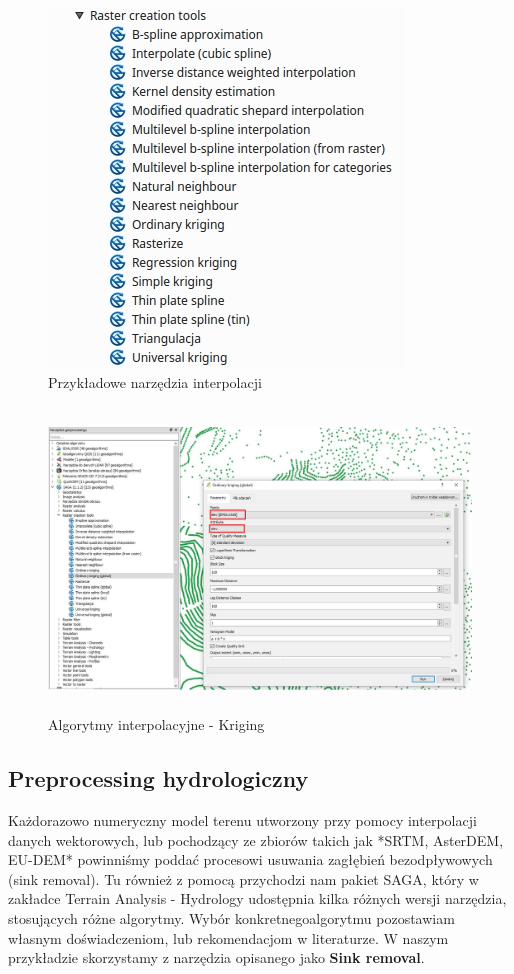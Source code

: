 \documentclass[12pt,a4paper]{book}
\begin{document}
\begin{center}
\begin{figure}
\includegraphics[width=9.446cm,height=9.525cm]{004-interpolacje.jpg}
\caption{Przykładowe narzędzia interpolacji}
\end{figure}
\end{center}
\begin{center}
\begin{figure}
\includegraphics[width=13cm,height=8.057cm]{004-kriging.jpg}
\caption{Algorytmy interpolacyjne - Kriging}
\end{figure}
\end{center}
\subsection{Preprocessing hydrologiczny}
Każdorazowo numeryczny model terenu utworzony przy pomocy interpolacji danych wektorowych, lub pochodzący ze zbiorów takich jak *SRTM, AsterDEM, EU-DEM* powinniśmy poddać procesowi usuwania zagłębień bezodpływowych (sink removal). Tu również z pomocą przychodzi nam pakiet SAGA, który w zakładce Terrain Analysis - Hydrology udostępnia kilka różnych wersji narzędzia, stosujących różne algorytmy. Wybór konkretnegoalgorytmu pozostawiam własnym doświadczeniom, lub rekomendacjom w literaturze. W naszym przykładzie skorzystamy z narzędzia opisanego jako \textbf{Sink removal}.
\end{document}
